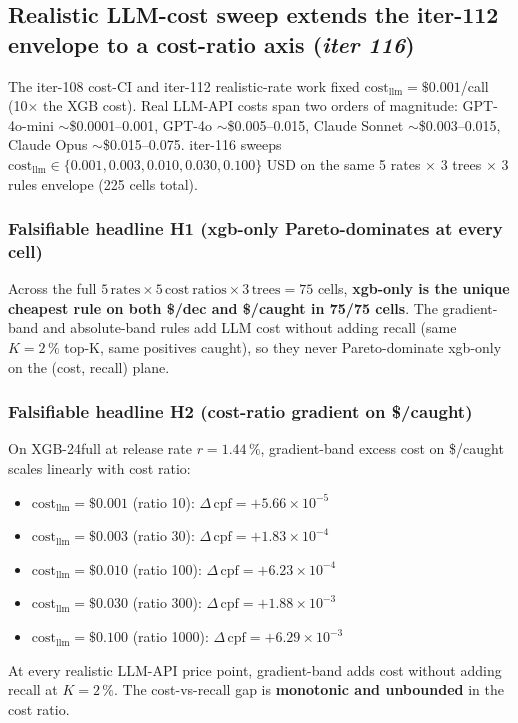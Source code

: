 \subsection{Realistic LLM-cost sweep extends the iter-112 envelope to a
  cost-ratio axis (\textit{iter 116})}
\label{sec:p8-llm-cost-sweep}

The iter-108 cost-CI and iter-112 realistic-rate work fixed
$\mathrm{cost}_{\mathrm{llm}}{=}\$0.001$/call (10$\times$ the XGB
cost).  Real LLM-API costs span two orders of magnitude:
GPT-4o-mini $\sim$\$0.0001--0.001, GPT-4o $\sim$\$0.005--0.015,
Claude Sonnet $\sim$\$0.003--0.015, Claude Opus
$\sim$\$0.015--0.075. iter-116 sweeps
$\mathrm{cost}_{\mathrm{llm}}\in\{0.001, 0.003, 0.010, 0.030, 0.100\}$
USD on the same 5 rates $\times$ 3 trees $\times$ 3 rules
envelope (225 cells total).

\subsubsection{Falsifiable headline H1 (xgb-only Pareto-dominates at every cell)}
Across the full $5\,\mathrm{rates}\times 5\,\mathrm{cost\ ratios}\times
3\,\mathrm{trees}=75$ cells, \textbf{xgb-only is the unique cheapest
rule on both \$/dec and \$/caught in 75/75 cells}. The gradient-band
and absolute-band rules add LLM cost without adding recall (same
$K{=}2\,\%$ top-K, same positives caught), so they never Pareto-dominate
xgb-only on the (cost, recall) plane.

\subsubsection{Falsifiable headline H2 (cost-ratio gradient on \$/caught)}
On XGB-24full at release rate $r{=}1.44\,\%$, gradient-band
excess cost on \$/caught scales linearly with cost ratio:
\begin{itemize}
  \item $\mathrm{cost}_{\mathrm{llm}}{=}\$0.001$ (ratio 10):
        $\Delta\,\mathrm{cpf}{=}+5.66{\times}10^{-5}$
  \item $\mathrm{cost}_{\mathrm{llm}}{=}\$0.003$ (ratio 30):
        $\Delta\,\mathrm{cpf}{=}+1.83{\times}10^{-4}$
  \item $\mathrm{cost}_{\mathrm{llm}}{=}\$0.010$ (ratio 100):
        $\Delta\,\mathrm{cpf}{=}+6.23{\times}10^{-4}$
  \item $\mathrm{cost}_{\mathrm{llm}}{=}\$0.030$ (ratio 300):
        $\Delta\,\mathrm{cpf}{=}+1.88{\times}10^{-3}$
  \item $\mathrm{cost}_{\mathrm{llm}}{=}\$0.100$ (ratio 1000):
        $\Delta\,\mathrm{cpf}{=}+6.29{\times}10^{-3}$
\end{itemize}
At every realistic LLM-API price point, gradient-band adds cost
without adding recall at $K{=}2\,\%$. The cost-vs-recall gap is
\textbf{monotonic and unbounded} in the cost ratio.

